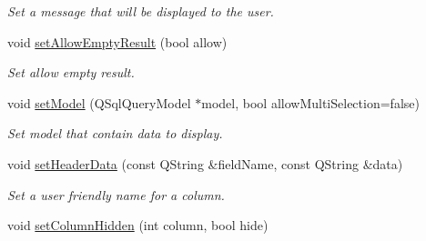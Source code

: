 \begin{DoxyCompactItemize}
\begin{DoxyCompactList}\small\item\em Set a message that will be displayed to the user. \end{DoxyCompactList}\item 
void \hyperlink{classmdt_sql_selection_dialog_a5265f64e773a64f34602ddf9b953821b}{setAllowEmptyResult} (bool allow)
\begin{DoxyCompactList}\small\item\em Set allow empty result. \end{DoxyCompactList}\item 
void \hyperlink{classmdt_sql_selection_dialog_aabe0554b9ca3f4a8d37a79e812dd8770}{setModel} (QSqlQueryModel $\ast$model, bool allowMultiSelection=false)
\begin{DoxyCompactList}\small\item\em Set model that contain data to display. \end{DoxyCompactList}\item 
void \hyperlink{classmdt_sql_selection_dialog_afc29f8965c2d6cc103d021ab54298a84}{setHeaderData} (const QString \&fieldName, const QString \&data)
\begin{DoxyCompactList}\small\item\em Set a user friendly name for a column. \end{DoxyCompactList}\item 
\hypertarget{classmdt_sql_selection_dialog_a8b7f8d24a959533ebe434443f19920c7}{
void \hyperlink{classmdt_sql_selection_dialog_a8b7f8d24a959533ebe434443f19920c7}{setColumnHidden} (int column, bool hide)}
\label{classmdt_sql_selection_dialog_a8b7f8d24a959533ebe434443f19920c7}


\end{DoxyCompactItemize}
